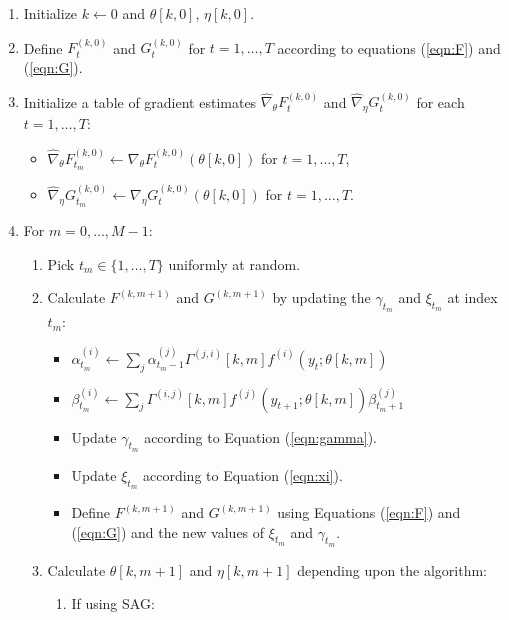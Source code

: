 \begin{enumerate}
    \item Initialize $k \leftarrow 0$ and $\theta[k,0]$, $\eta[k,0]$.
    \item Define $F_t^{(k,0)}$ and $G_t^{(k,0)}$ for $t = 1, \ldots, T$ according to equations (\ref{eqn:F}) and (\ref{eqn:G}).
    \item Initialize a table of gradient estimates $\widehat \nabla_\theta F_t^{(k,0)}$ and $\widehat \nabla_\eta G_t^{(k,0)}$ for each $t = 1,\ldots,T$:
    \begin{itemize}
        \item $\widehat \nabla_\theta F_{t_m}^{(k,0)} \leftarrow \nabla_\theta F_{t}^{(k,0)}(\theta[k,0])$ for $t = 1,\ldots,T$,
        \item $\widehat \nabla_\eta G_{t_m}^{(k,0)} \leftarrow \nabla_\eta G_{t}^{(k,0)}(\theta[k,0])$ for $t = 1,\ldots,T$.
    \end{itemize}
    \item For $m = 0,\ldots,M-1$:
    \begin{enumerate}
        \item Pick $t_m \in \{1,\ldots,T\}$ uniformly at random.
        \item Calculate $F^{(k,m+1)}$ and $G^{(k,m+1)}$ by updating the $\gamma_{t_m}$ and $\xi_{t_m}$ at index $t_m$:
        \begin{itemize}
            \item $\alpha^{(i)}_{t_m} \leftarrow \sum_j \alpha_{t_m-1}^{(j)} \Gamma^{(j,i)}[k,m] f^{(i)}(y_t;\theta[k,m])$
            \item $\beta^{(i)}_{t_m} \leftarrow \sum_j \Gamma^{(i,j)}[k,m] f^{(j)}(y_{t+1};\theta[k,m]) \beta_{t_m+1}^{(j)}$
            \item Update $\gamma_{t_m}$ according to Equation (\ref{eqn:gamma}).
            \item Update $\xi_{t_m}$ according to Equation (\ref{eqn:xi}).
            \item Define $F^{(k,m+1)}$ and $G^{(k,m+1)}$ using Equations (\ref{eqn:F}) and (\ref{eqn:G}) and the new values of $\xi_{t_m}$ and $\gamma_{t_m}$.
        \end{itemize}
        \item Calculate $\theta[k,m+1]$ and $\eta[k,m+1]$ depending upon the algorithm:
        \begin{enumerate}
            \item If using SAG:
            \begin{gather}

\end{gather}
\end{enumerate}
\end{enumerate}
\end{enumerate}
